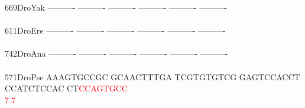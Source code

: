 \documentclass[11pt,twoside,reqno,a4paper]{article}
\begin{document}
{669\hspace*{2\charwidth}DroYak	----------	----------	----------	----------	----------	----------	\\
\hspace*{5\charwidth}\hspace*{7\charwidth}\hspace*{1\charwidth}\hspace*{1\charwidth}\hspace*{1\charwidth}\hspace*{1\charwidth}\hspace*{1\charwidth}\hspace*{1\charwidth}\\
611\hspace*{2\charwidth}DroEre	----------	----------	----------	----------	----------	----------	\\
\hspace*{5\charwidth}\hspace*{7\charwidth}\hspace*{1\charwidth}\hspace*{1\charwidth}\hspace*{1\charwidth}\hspace*{1\charwidth}\hspace*{1\charwidth}\hspace*{1\charwidth}\\
742\hspace*{2\charwidth}DroAna	----------	----------	----------	----------	----------	----------	\\
\hspace*{5\charwidth}\hspace*{7\charwidth}\hspace*{1\charwidth}\hspace*{1\charwidth}\hspace*{1\charwidth}\hspace*{1\charwidth}\hspace*{1\charwidth}\hspace*{1\charwidth}\\
571\hspace*{2\charwidth}DroPse	AAAGTGCCGC	GCAACTTTGA	TCGTGTGTCG	GAGTCCACCT	CCATCTCCAC	CT\textcolor{red}{C}\textcolor{red}{C}\textcolor{red}{A}\textcolor{red}{G}\textcolor{red}{T}\textcolor{red}{G}\textcolor{red}{C}\textcolor{red}{C}	\\
\hspace*{5\charwidth}\hspace*{7\charwidth}\hspace*{1\charwidth}\hspace*{1\charwidth}\hspace*{1\charwidth}\hspace*{1\charwidth}\hspace*{1\charwidth}\hspace*{52\charwidth}\textcolor{red}{7.7}\hspace*{1\charwidth}\\
}
\end{document}
